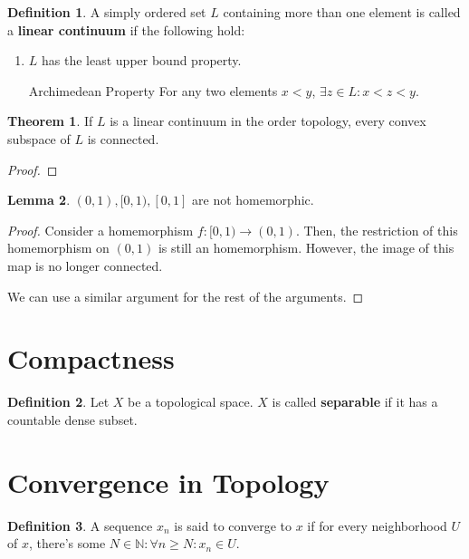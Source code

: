 \documentclass{article}
\theoremstyle{definition}
\newtheorem{definition}{Definition}
\newtheorem{theorem}{Theorem}[section]
\newtheorem{lemma}[theorem]{Lemma}
\newcommand{\N}{\mathbb{N}}
\begin{document}
\begin{definition}
    A simply ordered set $L$ containing more than one element is called a \textbf{linear continuum}
    if the following hold:

    \begin{enumerate}
        \item $L$ has the least upper bound property.
        \item[Archimedean Property] For any two elements $x < y$, $\exists z \in L: x < z < y$.
    \end{enumerate}
\end{definition}

\begin{theorem}
    If $L$ is a linear continuum in the order topology, every convex
    subspace of $L$ is connected.
\end{theorem}
\begin{proof}
    
\end{proof}

\begin{lemma}
    $(0,1), [0,1), [0,1]$ are not homemorphic.
\end{lemma}
\begin{proof}
    Consider a homemorphism $f: [0,1) \xrightarrow{} (0,1)$.
    Then, the restriction of this homemorphism on $(0,1)$
    is still an homemorphism. However, the image of this map is no longer
    connected.

    We can use a similar argument for the rest of the arguments.
\end{proof}

\newpage

\section{Compactness}

\begin{definition}
    Let $X$ be a topological space. $X$ is called \textbf{separable} if
    it has a countable dense subset.
\end{definition}

\newpage

\section{Convergence in Topology}

\begin{definition}
    A sequence $x_{n}$ is said to converge to $x$ if for every neighborhood
    $U$ of $x$, there's some $N \in \N: \forall n \geq N: x_{n} \in U$.
\end{definition}
\end{document}
